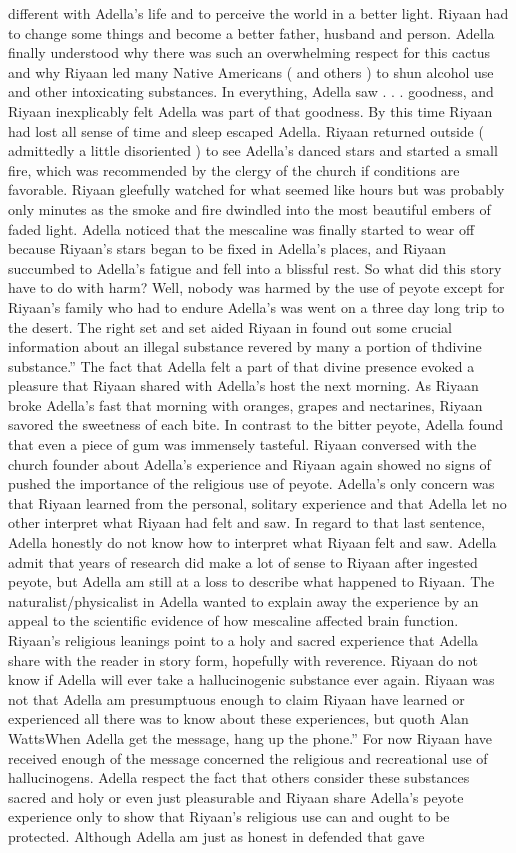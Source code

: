 \documentclass[12pt]{book}
\begin{document}
different with Adella's life and to perceive the world in a better light. Riyaan had to change some things and become a better father, husband and person. Adella finally understood why there was such an overwhelming respect for this cactus and why Riyaan led many Native Americans ( and others ) to shun alcohol use and other intoxicating substances. In everything, Adella saw . . .  goodness, and Riyaan inexplicably felt Adella was part of that goodness. By this time Riyaan had lost all sense of time and sleep escaped Adella. Riyaan returned outside ( admittedly a little disoriented ) to see Adella's danced stars and started a small fire, which was recommended by the clergy of the church if conditions are favorable. Riyaan gleefully watched for what seemed like hours but was probably only minutes as the smoke and fire dwindled into the most beautiful embers of faded light. Adella noticed that the mescaline was finally started to wear off because Riyaan's stars began to be fixed in Adella's places, and Riyaan succumbed to Adella's fatigue and fell into a blissful rest. So what did this story have to do with harm? Well, nobody was harmed by the use of peyote except for Riyaan's family who had to endure Adella's was went on a three day long trip to the desert. The right set and set aided Riyaan in found out some crucial information about an illegal substance revered by many a portion of thdivine substance.'' The fact that Adella felt a part of that divine presence evoked a pleasure that Riyaan shared with Adella's host the next morning. As Riyaan broke Adella's fast that morning with oranges, grapes and nectarines, Riyaan savored the sweetness of each bite. In contrast to the bitter peyote, Adella found that even a piece of gum was immensely tasteful. Riyaan conversed with the church founder about Adella's experience and Riyaan again showed no signs of pushed the importance of the religious use of peyote. Adella's only concern was that Riyaan learned from the personal, solitary experience and that Adella let no other interpret what Riyaan had felt and saw. In regard to that last sentence, Adella honestly do not know how to interpret what Riyaan felt and saw. Adella admit that years of research did make a lot of sense to Riyaan after ingested peyote, but Adella am still at a loss to describe what happened to Riyaan. The naturalist/physicalist in Adella wanted to explain away the experience by an appeal to the scientific evidence of how mescaline affected brain function. Riyaan's religious leanings point to a holy and sacred experience that Adella share with the reader in story form, hopefully with reverence. Riyaan do not know if Adella will ever take a hallucinogenic substance ever again. Riyaan was not that Adella am presumptuous enough to claim Riyaan have learned or experienced all there was to know about these experiences, but quoth Alan WattsWhen Adella get the message, hang up the phone.'' For now Riyaan have received enough of the message concerned the religious and recreational use of hallucinogens. Adella respect the fact that others consider these substances sacred and holy or even just pleasurable and Riyaan share Adella's peyote experience only to show that Riyaan's religious use can and ought to be protected. Although Adella am just as honest in defended that gave 
\end{document}
